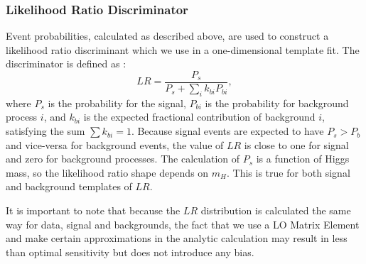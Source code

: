 

\subsubsection{Likelihood Ratio Discriminator}
Event probabilities, calculated as described above, are used to construct 
a likelihood ratio discriminant which we use in a one-dimensional template fit.  
The discriminator is defined as :
\begin{equation}
\label{eqn:LR}
LR = \frac { P_s} { P_s + \sum_i k_{bi} P_{bi}},
\end{equation}
where $P_s$  is the probability for the signal, $P_{bi}$ is the probability for background
process $i$, and
$k_{bi}$ is the expected fractional contribution of background $i$,
satisfying the sum $\sum k_{bi} =1$.
Because signal events are expected to have $P_s>P_b$ and vice-versa for background events, 
the value of $LR$ is close to one for signal and zero for background processes.
The calculation of $P_s$ is a function of Higgs mass, so the likelihood ratio
shape depends on $m_H$. This is true for both signal and background templates of $LR$. 

It is important to note that because the $LR$ distribution is calculated the same way for data, 
signal and backgrounds, the fact that we use a LO Matrix Element and make certain 
approximations in the analytic calculation may result in less than optimal sensitivity 
but does not introduce any bias.

